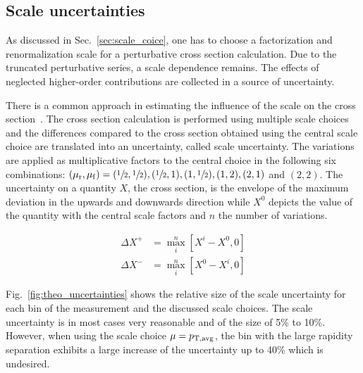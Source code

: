 \subsection{Scale uncertainties}
\label{sec:scale_uncertainties}

As discussed in Sec.~\ref{sec:scale_coice}, one has to choose a factorization
and renormalization scale for a perturbative cross section calculation. Due to
the truncated perturbative series, a scale dependence remains. The effects of
neglected higher-order contributions are collected in a source of uncertainty.

There is a common approach in estimating the influence of the scale on the cross
section~\cite{Banfi:2010xy}. The cross section calculation is performed using
multiple scale choices and the differences compared to the cross section
obtained using the central scale choice are translated into an uncertainty,
called scale uncertainty. The variations are applied as multiplicative factors
to the central choice in the following six combinations: $(\mu_{\mathrm{r}}, \mu_{\mathrm{f}}) =
(\sfrac{1}{2}, \sfrac{1}{2}), (\sfrac{1}{2}, 1), (1, \sfrac{1}{2}), (1, 2), (2,
1)$ and $(2, 2)$. The uncertainty on a quantity $X$, \eg the cross section, is
the envelope of the maximum deviation in the upwards and downwards direction
while $X^0$ depicts the value of the quantity with the central scale factors and
$n$ the number of variations.

\begin{align*}
    \Delta X^+ &= \max_{i}^{n} \left[ X^i - X^0, 0 \right]\\
    \Delta X^- &= \max_{i}^{n} \left[ X^0 - X^i, 0 \right]
\end{align*}


Fig.~\ref{fig:theo_uncertainties} shows the relative size of the scale
uncertainty for each bin of the measurement and the discussed scale choices. The
scale uncertainty is in most cases very reasonable and of the size of 5\% to
10\%. However, when using the scale choice $\mu=p_{\mathrm{T,avg}}$, the bin with the large
rapidity separation exhibits a large increase of the uncertainty up to 40\%
which is undesired.

